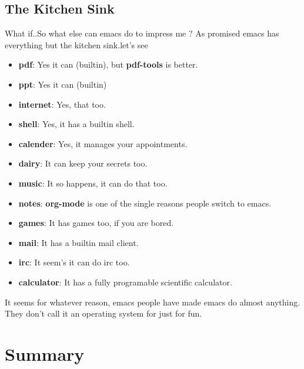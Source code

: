\documentclass{beamer}
\begin{document}
\subsection{The Kitchen Sink}
\begin{frame}{What if..}{So what else can emacs do to impress me ?}
	As promised emacs has everything but the kitchen sink.\pause \alert{let's see} \\
	\begin{itemize}
		\item {
				\textbf{pdf}: Yes it can (builtin), but \textbf{pdf-tools} is better.
				\pause
				}
		\item {
				\textbf{ppt}: Yes it can (builtin)
				\pause
				}
		\item {
				\textbf{internet}: Yes, that too.
				\pause
				}
		\item {
				\textbf{shell}: Yes, it has a builtin shell.
				\pause
				}
		\item {
				\textbf{calender}: Yes, it manages your appointments.
				\pause
				}
		\item{
				\textbf{dairy}: It can keep your secrets too.
				\pause
				}
		\item{
				\textbf{music}: It so happens, it can do that too.
				\pause
				}
		\item{
				\textbf{notes}: \textbf{org-mode} is one of the single reasons people switch to emacs.
				\pause
				}
		\item{
				\textbf{games}: It has games too, if you are bored.
				\pause
				}

		\item{
				\textbf{mail}: It has a builtin mail client.
				\pause
				}
		\item{
				\textbf{irc}: It seem's it can do irc too.
				\pause
				}
		\item{
				\textbf{calculator}: It has a fully programable scientific calculator.
				\pause
				}

	\end{itemize}
	It seems for whatever reason, emacs people have made emacs do almost anything.\\
	They don't call it an operating system for just for fun.
\end{frame}
\section*{Summary}
\end{document}
